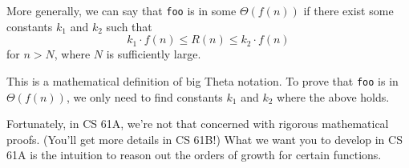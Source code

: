 More generally, we can say that {\tt foo} is in some $\Theta(f(n))$ if there exist
some constants $k_1$ and $k_2$ such that
\begin{equation*}
 k_1 \cdot f(n) \leq R(n) \leq k_2 \cdot f(n)
\end{equation*}
for $n > N$, where $N$ is sufficiently large.

This is a mathematical definition of big Theta notation. To prove that {\tt foo}
is in $\Theta(f(n))$, we only need to find constants $k_1$ and $k_2$ where the
above holds.

Fortunately, in CS 61A, we're not that concerned with rigorous mathematical
proofs. (You'll get more details in CS 61B!) What we want you to develop in CS
61A is the intuition to reason out the orders of growth for certain functions.
